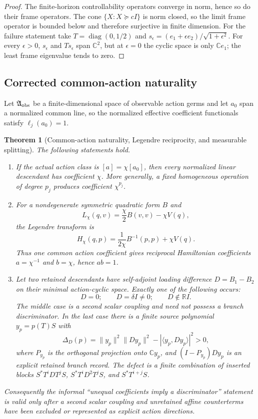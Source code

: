 \documentclass[11pt]{article}
\newtheorem{theorem}{Theorem}[section]
\theoremstyle{definition}
\theoremstyle{remark}
\newcommand{\R}{\mathbb R}
\newcommand{\C}{\mathbb C}
\newcommand{\norm}[1]{\lVert#1\rVert}
\begin{document}
\begin{proof}
The finite-horizon controllability operators converge in norm, hence so do
their frame operators.  The cone $\{X:X\succeq cI\}$ is norm closed, so the
limit frame operator is bounded below and therefore surjective in finite
dimension.  For the failure statement take
$T=\operatorname{diag}(0,1/2)$ and
$s_\epsilon=(e_1+\epsilon e_2)/\sqrt{1+\epsilon^2}$.  For every
$\epsilon>0$, $s_\epsilon$ and $Ts_\epsilon$ span $\C^2$, but at
$\epsilon=0$ the cyclic space is only $\C e_1$; the least frame eigenvalue
tends to zero.
\end{proof}

\subsection{Corrected common-action naturality}

Let $\mathfrak A_{\rm obs}$ be a finite-dimensional space of observable action
germs and let $a_0$ span a normalized common line, so the normalized effective
coefficient functionals satisfy $\ell_j(a_0)=1$.

\begin{theorem}[Common-action naturality, Legendre reciprocity, and measurable splitting]
\label{thm:naturality-splitting}
The following statements hold.
\begin{enumerate}[label=\textup{(\roman*)},leftmargin=2.7em]
\item If the actual action class is $[a]=\chi[a_0]$, then every normalized
      linear descendant has coefficient $\chi$.  More generally, a fixed
      homogeneous operation of degree $p_j$ produces coefficient $\chi^{p_j}$.
\item For a nondegenerate symmetric quadratic form $B$ and
      \[
        L_\chi(q,v)=\frac\chi2B(v,v)-\chi V(q),
      \]
      the Legendre transform is
      \[
        H_\chi(q,p)=\frac1{2\chi}B^{-1}(p,p)+\chi V(q).
      \]
      Thus one common action coefficient gives reciprocal Hamiltonian
      coefficients $a=\chi^{-1}$ and $b=\chi$, hence $ab=1$.
\item Let two retained descendants have self-adjoint loading difference
      $D=B_1-B_2$ on their minimal action-cyclic space.  Exactly one of the
      following occurs:
      \[
      D=0;\qquad D=\delta I\ne0;\qquad D\notin\R I.
      \]
      The middle case is a second scalar coupling and need not possess a branch
      discriminator.  In the last case there is a finite source polynomial
      $y_p=p(T)S$ with
      \[
        \boxed{
        \Delta_D(p)
        =\norm{y_p}^2\norm{Dy_p}^2
         -|\langle y_p,Dy_p\rangle|^2>0,}
      \]
      where $P_{y_p}$ is the orthogonal projection onto $\C y_p$, and
      $(I-P_{y_p})Dy_p$ is an explicit retained branch record.  The defect
      is a finite combination of inserted blocks
      $S^*T^iDT^jS$, $S^*T^iD^2T^jS$, and $S^*T^{i+j}S$.
\end{enumerate}
Consequently the informal ``unequal coefficients imply a discriminator''
statement is valid only after a second scalar coupling and unretained affine
counterterms have been excluded or represented as explicit action directions.
\end{theorem}
\end{document}
